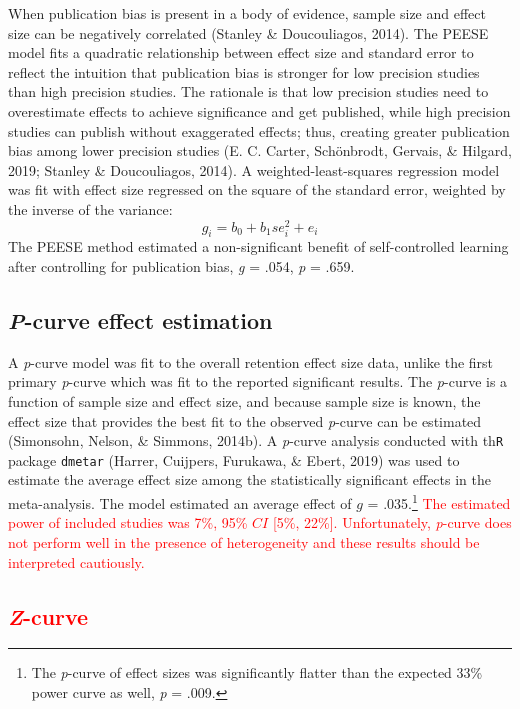 \documentclass[
  english,
  man,floatsintext]{apa7}
\begin{document}
When publication bias is present in a body of evidence, sample size and effect size can be negatively correlated (Stanley \& Doucouliagos, 2014). The PEESE model fits a quadratic relationship between effect size and standard error to reflect the intuition that publication bias is stronger for low precision studies than high precision studies. The rationale is that low precision studies need to overestimate effects to achieve significance and get published, while high precision studies can publish without exaggerated effects; thus, creating greater publication bias among lower precision studies (E. C. Carter, Schönbrodt, Gervais, \& Hilgard, 2019; Stanley \& Doucouliagos, 2014). A weighted-least-squares regression model was fit with effect size regressed on the square of the standard error, weighted by the inverse of the variance:
\[g_{i} = b_{0} + b_{1}se_{i}^2 + e_{i}\]
The PEESE method estimated a non-significant benefit of self-controlled learning after controlling for publication bias, \emph{g} = .054, \emph{p} = .659.

\hypertarget{p-curve-effect-estimation}{%
\subsection{\texorpdfstring{\emph{P}-curve effect estimation}{P-curve effect estimation}}\label{p-curve-effect-estimation}}

A \emph{p}-curve model was fit to the overall retention effect size data, unlike the first primary \emph{p}-curve which was fit to the reported significant results. The \emph{p}-curve is a function of sample size and effect size, and because sample size is known, the effect size that provides the best fit to the observed \emph{p}-curve can be estimated (Simonsohn, Nelson, \& Simmons, 2014b). A \emph{p}-curve analysis conducted with th\texttt{R} package \texttt{dmetar} (Harrer, Cuijpers, Furukawa, \& Ebert, 2019) was used to estimate the average effect size among the statistically significant effects in the meta-analysis. The model estimated an average effect of \(g\) = .035.\footnote{The \emph{p}-curve of effect sizes was significantly flatter than the expected 33\% power curve as well, \emph{p} = .009.} \textcolor{red}{The estimated power of included studies was 7\%, 95\% $CI$ [5\%, 22\%]. Unfortunately, \emph{p}-curve does not perform well in the presence of heterogeneity and these results should be interpreted cautiously.}

\hypertarget{section-2}{%
\subsection{\texorpdfstring{\textcolor{red}{\emph{Z}-curve}}{}}\label{section-2}}
\end{document}

